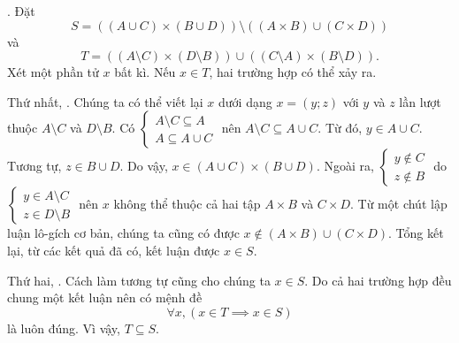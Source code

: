 . Đặt $$S = \left( (A \cup C) \times (B \cup D) \right) \setminus \left((A \times B) \cup (C \times D)\right) $$ và $$T = \left( (A \setminus C) \times (D \setminus B) \right) \cup \left( (C \setminus A) \times (B \setminus D) \right).$$ Xét một phần tử $x$ bất kì. Nếu $x \in T$, hai trường hợp có thể xảy ra.

Thứ nhất, . Chúng ta có thể viết lại $x$ dưới dạng $x = (y; z)$ với $y$ và $z$ lần lượt thuộc $A \setminus C$ và $D \setminus B$. Có $\begin{cases}
   A \setminus C \subseteq A \\
   A \subseteq A \cup C
\end{cases}$ nên $A \setminus C \subseteq A \cup C$. Từ đó, $y \in A \cup C$. Tương tự, $z \in B \cup D$. Do vậy, $x \in (A \cup C) \times (B \cup D)$. Ngoài ra, $\begin{cases}
   y \notin C \\
   z \notin B
\end{cases}$ do $\begin{cases}
   y \in A \setminus C \\
   z \in D \setminus B
\end{cases}$ nên $x$ không thể thuộc cả hai tập $A \times B$ và $C \times D$. Từ một chút lập luận lô-gích cơ bản, chúng ta cũng có được $x \notin (A \times B) \cup (C \times D)$. Tổng kết lại, từ các kết quả đã có, kết luận được $x \in S$. 

Thứ hai, . Cách làm tương tự cũng cho chúng ta $x \in S$. Do cả hai trường hợp đều chung một kết luận nên có mệnh đề $$\forall x, (x \in T \implies x \in S)$$ là luôn đúng. Vì vậy, $T \subseteq S$.

